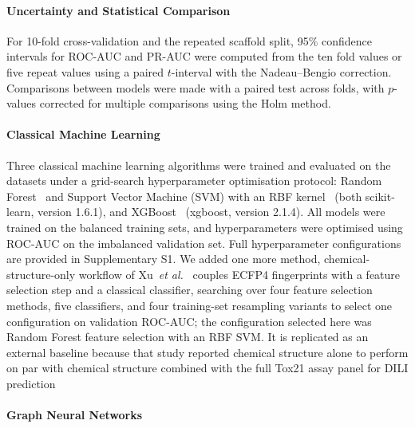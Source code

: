 \documentclass[letterpaper]{article}
\begin{document}
\paragraph{Uncertainty and Statistical Comparison}

For 10-fold cross-validation and the repeated scaffold split, 95\%
confidence intervals for ROC-AUC and PR-AUC were computed from the ten fold
values or five repeat values using a paired $t$-interval with the
Nadeau--Bengio correction. Comparisons between models were made with a
paired test across folds, with $p$-values corrected for multiple comparisons
using the Holm method.

\paragraph{Classical Machine Learning}

Three classical machine learning algorithms were trained and evaluated on the datasets under a grid-search hyperparameter optimisation protocol: Random Forest~\cite{breiman2001random} and Support Vector Machine (SVM) with an RBF kernel~\cite{cortes1995support} (both scikit-learn, version 1.6.1), and XGBoost~\cite{chen2016xgboost} (xgboost, version 2.1.4). All models were trained on the balanced training sets, and hyperparameters were optimised using ROC-AUC on the imbalanced validation set. Full hyperparameter configurations are provided in Supplementary S1.%
We added one more method, chemical-structure-only workflow of Xu~\textit{et al.}~\cite{xu2026expanded}
couples ECFP4 fingerprints with a feature selection step and a classical
classifier, searching over four feature selection methods, five classifiers, and
four training-set resampling variants to select one configuration on validation
ROC-AUC; the configuration selected here was Random Forest feature selection
with an RBF SVM. It is replicated as an external baseline because that study
reported chemical structure alone to perform on par with chemical structure
combined with the full Tox21 assay panel for DILI prediction

\paragraph{Graph Neural Networks}
\end{document}
